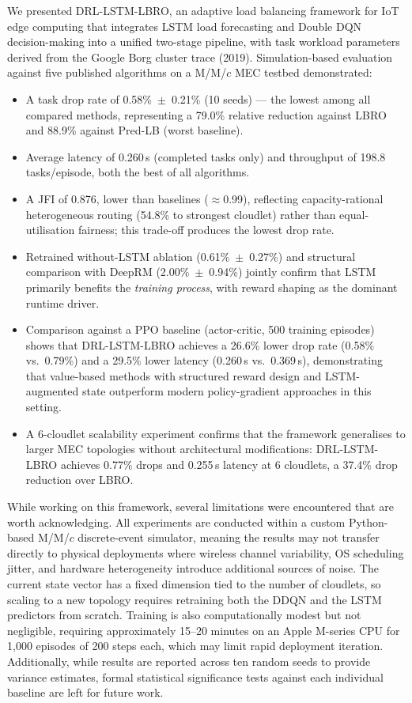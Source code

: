 \documentclass[conference]{IEEEtran}
\begin{document}
We presented DRL-LSTM-LBRO, an adaptive load balancing framework for
IoT edge computing that integrates LSTM load forecasting and Double DQN
decision-making into a unified two-stage pipeline, with task workload
parameters derived from the Google Borg cluster trace (2019). Simulation-based
evaluation against five published algorithms on a M/M/$c$ MEC testbed demonstrated:
\begin{itemize}
    \item A task drop rate of 0.58\%~$\pm$~0.21\% (10 seeds) --- the
    lowest among all compared methods, representing a 79.0\% relative
    reduction against LBRO~\cite{nayyer2022lbro} and 88.9\% against
    Pred-LB (worst baseline).
    \item Average latency of 0.260\,s (completed tasks only) and throughput
    of 198.8 tasks/episode, both the best of all algorithms.
    \item A JFI of 0.876, lower than baselines ($\approx$0.99), reflecting
    capacity-rational heterogeneous routing (54.8\% to strongest cloudlet)
    rather than equal-utilisation fairness; this trade-off produces
    the lowest drop rate.
    \item Retrained without-LSTM ablation (0.61\%~$\pm$~0.27\%) and
    structural comparison with DeepRM (2.00\%~$\pm$~0.94\%) jointly
    confirm that LSTM primarily benefits the \emph{training process},
    with reward shaping as the dominant runtime driver.
    \item Comparison against a PPO baseline (actor-critic, 500 training
    episodes) shows that DRL-LSTM-LBRO achieves a 26.6\% lower drop
    rate (0.58\% vs.\ 0.79\%) and a 29.5\% lower latency (0.260\,s
    vs.\ 0.369\,s), demonstrating that value-based methods with
    structured reward design and LSTM-augmented state outperform
    modern policy-gradient approaches in this setting.
    \item A 6-cloudlet scalability experiment confirms that the
    framework generalises to larger MEC topologies without architectural
    modifications: DRL-LSTM-LBRO achieves 0.77\% drops and 0.255\,s
    latency at 6 cloudlets, a 37.4\% drop reduction over LBRO.
\end{itemize}

While working on this framework, several limitations were encountered
that are worth acknowledging. All experiments are conducted within a
custom Python-based M/M/$c$ discrete-event simulator, meaning the
results may not transfer directly to physical deployments where
wireless channel variability, OS scheduling jitter, and hardware
heterogeneity introduce additional sources of noise. The current
state vector has a fixed dimension tied to the number of cloudlets,
so scaling to a new topology requires retraining both the DDQN and
the LSTM predictors from scratch. Training is also computationally
modest but not negligible, requiring approximately 15--20 minutes on
an Apple M-series CPU for 1{,}000 episodes of 200 steps each,
which may limit rapid deployment iteration. Additionally, while
results are reported across ten random seeds to provide variance
estimates, formal statistical significance tests against each
individual baseline are left for future work.
\end{document}

